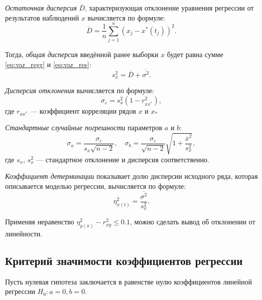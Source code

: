 \textit{Остаточная дисперсия} $\overline{D}$, характеризующая отклонение уравнения регрессии от результатов наблюдений $x$ вычисляется по формуле:
\begin{equation}
\label{eq:var_res}
	\overline{D} = \frac{1}{n} \sum_{j=1}^{n}{(x_j - x^{*}(t_j))^2}.
\end{equation}

Тогда, \textit{общая дисперсия} введённой ранее выборки $x$ будет равна сумме \ref{eq:var_regr} и \ref{eq:var_res}:
\begin{equation*}
	s_x^2 = \overline{D} + \overline{\sigma^2}.
\end{equation*}

\textit{Дисперсия отклонения} вычисляется по формуле:
\begin{equation*}
	\sigma_{\varepsilon} = s_x^2(1 - r_{xx^{*}}^2),
\end{equation*}
где $r_{xx^{*}}$ --- коэффициент корреляции рядов $x$ и $x_{*}$

\textit{Стандартные случайные погрешности} параметров $a$ и $b$:
\begin{equation*}
	\sigma_a = \frac{\sigma_{\varepsilon }}{s_x \sqrt{n - 2}}, \quad \sigma_b = \frac{\sigma_{\varepsilon}}{\sqrt{n-2}} \sqrt{1 + \frac{\overline{x}^2}{s_x^2}},
\end{equation*}
где $s_x$, $s_x^2$ --- стандартное отклонение и дисперсия соответственно.

\textit{Коэффициент детерминации} показывает долю дисперсии исходного ряда, которая описывается моделью регрессии, вычисляется по формуле:
\begin{equation*}
	\eta_{x(t)}^2 = \frac{\overline{\sigma^2}}{s_x^2}.
\end{equation*}

Применяя неравенство $\eta_{y(x)}^2 - r_{xy}^2 \le 0.1$, можно сделать вывод об отклонении от линейности.

\subsection*{Критерий значимости коэффициентов регрессии} %
\label{subsec:sign_regr}

Пусть нулевая гипотеза заключается в равенстве нулю коэффициентов линейной регрессии $H_0: a=0, b=0$.

